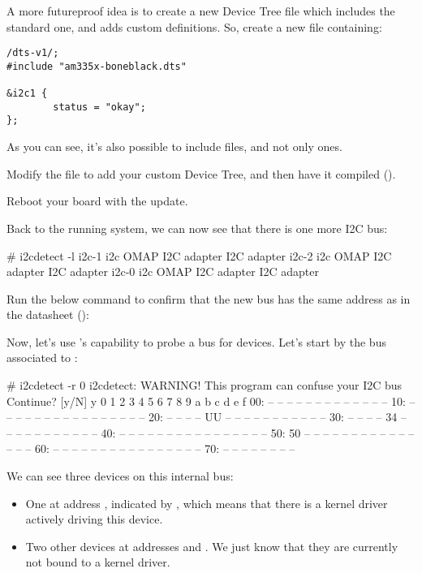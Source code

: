 {A more futureproof idea is to create a new Device Tree file which
includes the standard one, and adds custom definitions. So, create a
new  file containing:

\begin{verbatim}
/dts-v1/;
#include "am335x-boneblack.dts"

&i2c1 {
        status = "okay";
};
\end{verbatim}

As you can see, it's also possible to include  files, and not
only  ones.

Modify the  file to add your custom
Device Tree, and then have it compiled ().

Reboot your board with the update.

Back to the running system, we can now see that there is one more
I2C bus:

\begin{bashinput}
# i2cdetect -l
i2c-1	i2c             OMAP I2C adapter                        I2C adapter
i2c-2	i2c             OMAP I2C adapter                        I2C adapter
i2c-0	i2c             OMAP I2C adapter                        I2C adapter
\end{bashinput}

Run the below command to confirm that the new bus has the same address
as in the datasheet ():


Now, let's use 's capability to probe a bus for devices.
Let's start by the bus associated to :

\begin{bashinput}
# i2cdetect -r 0
i2cdetect: WARNING! This program can confuse your I2C bus
Continue? [y/N] y
     0  1  2  3  4  5  6  7  8  9  a  b  c  d  e  f
00:          -- -- -- -- -- -- -- -- -- -- -- -- --
10: -- -- -- -- -- -- -- -- -- -- -- -- -- -- -- --
20: -- -- -- -- UU -- -- -- -- -- -- -- -- -- -- --
30: -- -- -- -- 34 -- -- -- -- -- -- -- -- -- -- --
40: -- -- -- -- -- -- -- -- -- -- -- -- -- -- -- --
50: 50 -- -- -- -- -- -- -- -- -- -- -- -- -- -- --
60: -- -- -- -- -- -- -- -- -- -- -- -- -- -- -- --
70: -- -- -- -- -- -- -- --
\end{bashinput}

We can see three devices on this internal bus:
\begin{itemize}
\item One at address , indicated by ,
      which means that there is a kernel driver actively
      driving this device.
\item Two other devices at addresses  and .
      We just know that they are currently not bound to a kernel driver.
\end{itemize}

}
